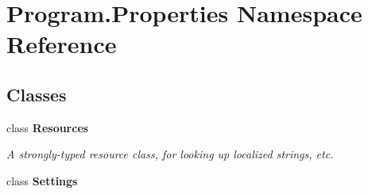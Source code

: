 \hypertarget{namespace_program_1_1_properties}{}\section{Program.\+Properties Namespace Reference}
\label{namespace_program_1_1_properties}
\subsection*{Classes}
\begin{DoxyCompactItemize}
\item 
class {\bfseries Resources}
\begin{DoxyCompactList}\small\item\em A strongly-\/typed resource class, for looking up localized strings, etc. \end{DoxyCompactList}\item 
class {\bfseries Settings}
\end{DoxyCompactItemize}
